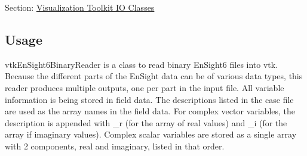 Section\-: \hyperlink{sec_vtkio}{Visualization Toolkit I\-O Classes} \hypertarget{vtkwidgets_vtkxyplotwidget_Usage}{}\subsection{Usage}\label{vtkwidgets_vtkxyplotwidget_Usage}
vtk\-En\-Sight6\-Binary\-Reader is a class to read binary En\-Sight6 files into vtk. Because the different parts of the En\-Sight data can be of various data types, this reader produces multiple outputs, one per part in the input file. All variable information is being stored in field data. The descriptions listed in the case file are used as the array names in the field data. For complex vector variables, the description is appended with \-\_\-r (for the array of real values) and \-\_\-i (for the array if imaginary values). Complex scalar variables are stored as a single array with 2 components, real and imaginary, listed in that order.

